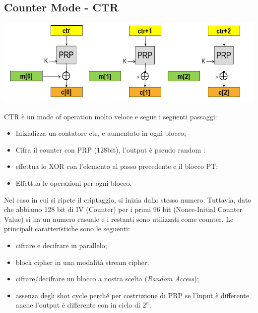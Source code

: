 \documentclass{book}
\theoremstyle{remark}
\begin{document}
\subsection{Counter Mode - CTR}
\begin{center}
	\includegraphics[scale=0.6]{CounterMOde.png}
\end{center}
CTR è un mode of operation molto veloce e segue i seguenti passaggi:
\begin{itemize}
	\item Inizializza un contatore ctr, e aumentato in ogni blocco;\@
	\item Cifra il counter con PRP (128bit), l'output è pseudo random :
	\item effettua lo XOR con l'elemento al passo precedente e il blocco PT;\@
	\item Effettua le operazioni per ogni blocco\@.
\end{itemize}
Nel caso in cui si ripete il criptaggio, si inizia dallo stesso numero\@. Tuttavia, dato che abbiamo 128 bit di IV (Counter) per i primi 96 bit (Nonce-Initial Counter Value) si ha un numero casuale e i restanti sono utilizzati come counter\@.
Le principali caratteristiche sono le seguenti:\begin{itemize}
	\item cifrare e decifrare in parallelo;\@
	\item block cipher in una modalità stream cipher;\@
	\item cifrare/decifrare un blocco a nostra scelta (\emph{Random Access});\@
	\item assenza degli shot cycle perché per costruzione di PRP se l'ìnput è differente anche l'output è differente con in ciclo di \(2^{n}\)\@.
\end{itemize}
\end{document}

